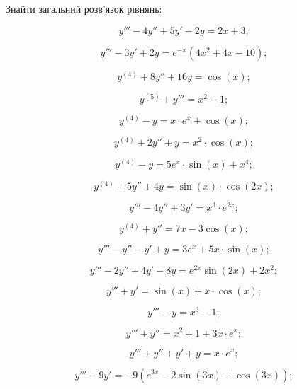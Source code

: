 Знайти загальний розв’язок рівнянь:

\begin{multicols}{2}
\begin{problem}
	\[y'''-4y''+5y'-2y=2x+3;\]
\end{problem}
\begin{problem}
	\[y'''-3y'+2y=e^{-x}(4x^2+4x-10);\]
\end{problem}
\begin{problem}
	\[y^{(4)}+8y''+16y=\cos(x);\]
\end{problem}
\begin{problem}
	\[y^{(5)}+y'''=x^2-1;\]
\end{problem}
\begin{problem}
	\[y^{(4)}-y=x\cdot e^x+\cos(x);\]
\end{problem}
\begin{problem}
	\[y^{(4)}+2y''+y=x^2\cdot\cos(x);\]
\end{problem}
\begin{problem}
	\[y^{(4)}-y=5e^x\cdot\sin(x)+x^4;\]
\end{problem}
\begin{problem}
	\[y^{(4)}+5y''+4y=\sin(x)\cdot\cos(2x);\]
\end{problem}
\begin{problem}
	\[y'''-4y''+3y'=x^3 \cdot e^{2x};\]
\end{problem}
\begin{problem}
	\[y^{(4)}+y''=7x-3\cos(x);\]
\end{problem}
\begin{problem}
	\[y'''-y''-y'+y=3e^x+5x\cdot\sin(x);\]
\end{problem}
\begin{problem}
	\[y'''-2y''+4y'-8y=e^{2x}\sin(2x)+2x^2;\]
\end{problem}
\begin{problem}
	\[y'''+y'=\sin(x)+x\cdot\cos(x);\]
\end{problem}
\begin{problem}
	\[y'''-y=x^3-1;\]
\end{problem}
\begin{problem}
	\[y'''+y''=x^2+1+3x\cdot e^x;\]
\end{problem}
\begin{problem}
	\[y'''+y''+y'+y=x\cdot e^x;\]
\end{problem}
\begin{problem}
	\[y'''-9y'=-9(e^{3x}-2\sin(3x)+\cos(3x));\]
\end{problem}
\begin{problem}

\end{problem}
\end{multicols}
